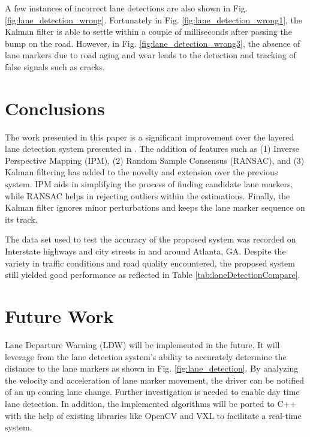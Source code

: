 \documentclass{article}
\begin{document}
A few instances of incorrect lane detections are also shown in Fig. \ref{fig:lane_detection_wrong}. Fortunately in Fig. \ref{fig:lane_detection_wrong1}, the Kalman filter is able to settle within a couple of milliseconds after passing the bump on the road. However, in Fig. \ref{fig:lane_detection_wrong3}, the absence of lane markers due to road aging and wear leads to the detection and tracking of false signals such as cracks.
\section{Conclusions}
\label{sec:concl}
The work presented in this paper is a significant improvement over the layered lane detection system presented in \cite{borkar_layered_2009}. The addition of features such as (1) Inverse Perspective Mapping (IPM), (2) Random Sample Consensus (RANSAC), and (3) Kalman filtering has added to the novelty and extension over the previous system. IPM aids in simplifying the process of finding candidate lane markers, while RANSAC helps in rejecting outliers within the estimations. Finally, the Kalman filter ignores minor perturbations and keeps the lane marker sequence on its track.

The data set used to test the accuracy of the proposed system was recorded on Interstate highways and city streets in and around Atlanta, GA. Despite the variety in traffic conditions and road quality encountered, the proposed system still yielded good performance as reflected in Table \ref{tab:laneDetectionCompare}.

\section{Future Work}
\label{sec:print}
Lane Departure Warning (LDW) will be implemented in the future. It will leverage from the lane detection system's ability to accurately determine the distance to the lane markers as shown in Fig. \ref{fig:lane_detection}. By analyzing the velocity and acceleration of lane marker movement, the driver can be notified of an up coming lane change. Further investigation is needed to enable day time lane detection. In addition, the implemented algorithms will be ported to C++ with the help of existing libraries like OpenCV and VXL to facilitate a real-time system.

\small


\end{document}

